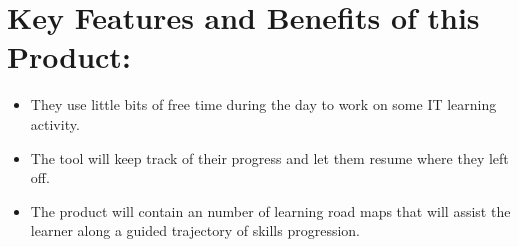 \section{Key Features and Benefits of this Product:}

\begin{itemize}
    \item They use little bits of free time during the day to work on some IT learning activity.
    \item The tool will keep track of their progress and let them resume where they left off.
    \item The product will contain an number of learning road maps that will assist the learner along a guided trajectory of skills progression.  
\end{itemize}